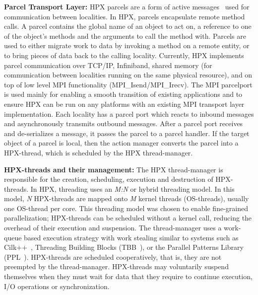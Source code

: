 \documentclass{sig-alternate}
\newcommand{\I}[1]{\textit{#1}}
\newcommand{\B}[1]{\textbf{#1}}
\newcommand{\upp}{\vspace*{-0.5em}}
\newcommand{\up}{\vspace*{-0.25em}}
\begin{document}
\B{Parcel Transport Layer:} HPX parcels are a form of active messages~\cite{Wall:1982:MAA:582153.582157} used for
communication between localities. In HPX, parcels encapsulate remote method calls. A
parcel contains the global name of an object to act on, a reference to one of
the object's methods and the arguments to call the method with. Parcels are
used to either migrate work to data by invoking a method on a remote entity, or
to bring pieces of data back to the calling locality. Currently, HPX
implements parcel communication over TCP/IP, Infiniband, shared memory (for
communication between localities running on the same physical resource), and on top
of low level MPI functionality (MPI\_Isend/MPI\_Irecv).
The MPI parcelport is used mainly for enabling a smooth transition of existing applications
and to ensure HPX can be run on any platforms with an existing MPI transport layer
implementation.
Each locality has a parcel port
which reacts to inbound messages and  asynchronously transmits outbound messages.
After a parcel port receives and de-serializes a message, it passes the parcel to a
parcel handler.
If the target object of a parcel is local, then the action manager
converts the parcel into a HPX-thread, which is scheduled by the HPX
thread-manager.

\B{HPX-threads and their management:} The HPX thread-manager is responsible for
the creation, scheduling, execution and destruction of HPX-threads. In HPX,
threading uses an \I{M:N} or hybrid threading model. In this model, \I{N} HPX-threads
are mapped onto \I{M} kernel threads (OS-threads), usually one OS-thread per core.
This threading model
was chosen to enable fine-grained parallelization; HPX-threads can be scheduled
without a kernel call, reducing the overhead of their execution and
suspension. The thread-manager uses a work-queue based execution strategy with work stealing
similar to systems such as Cilk++~\cite{cilk++}, Threading Building Blocks (TBB~\cite{inteltbb}), or
the Parallel Patterns Library (PPL~\cite{microsoftppl}). HPX-threads are scheduled cooperatively, that is,
they are not preempted by the thread-manager. HPX-threads may voluntarily
suspend themselves when they must wait for data that they require to continue
execution, I/O operations or synchronization.
\end{document}
